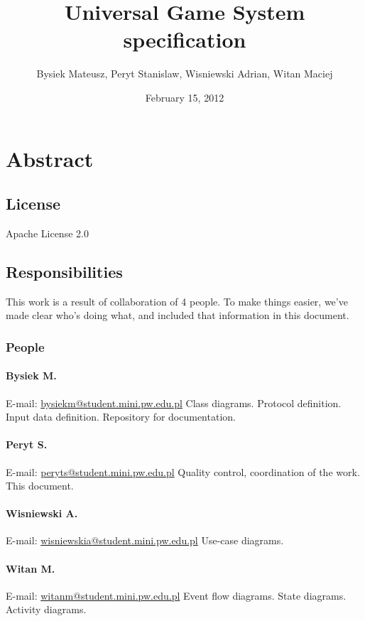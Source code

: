 \documentclass{article}
\begin{document}
\title{Universal Game System specification}
\date{February 15, 2012}
\author{Bysiek Mateusz, Peryt Stanislaw, Wisniewski Adrian, Witan Maciej}
\maketitle

\tableofcontents


\pagebreak[4]


\section{Abstract}

\subsection{License}
Apache License 2.0

\subsection{Responsibilities}
This work is a result of collaboration of 4 people. To make things easier, 
we've made clear who's doing what, and included that information in this document.

\subsubsection{People}
\paragraph{Bysiek M.} E-mail: \url{bysiekm@student.mini.pw.edu.pl}
Class diagrams. Protocol definition. Input data definition. Repository for documentation.
\paragraph{Peryt S.} E-mail: \url{peryts@student.mini.pw.edu.pl}
Quality control, coordination of the work. This document.
\paragraph{Wisniewski A.} E-mail: \url{wisniewskia@student.mini.pw.edu.pl}
Use-case diagrams.
\paragraph{Witan M.} E-mail: \url{witanm@student.mini.pw.edu.pl}
Event flow diagrams. State diagrams. Activity diagrams.
\end{document}
